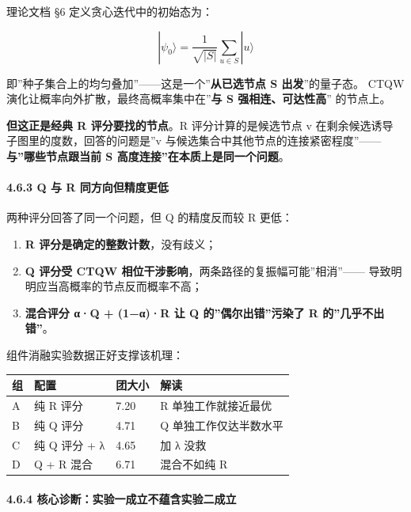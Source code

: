 \documentclass[
  11pt,
]{ctexart}
\newcounter{none} %
\providecommand{\tightlist}{%
  \setlength{\itemsep}{0pt}\setlength{\parskip}{0pt}}
\begin{document}
理论文档 §6 定义贪心迭代中的初始态为：

\[|\psi_0\rangle = \frac{1}{\sqrt{|S|}} \sum_{u \in S} |u\rangle\]

即''种子集合上的均匀叠加''------这是一个''\textbf{从已选节点 S
出发}''的量子态。 CTQW 演化让概率向外扩散，最终高概率集中在''\textbf{与
S 强相连、可达性高}'' 的节点上。

\textbf{但这正是经典 R 评分要找的节点}。R 评分计算的是候选节点 v
在剩余候选诱导 子图里的度数，回答的问题是''v
与候选集合中其他节点的连接紧密程度''------ \textbf{与''哪些节点跟当前 S
高度连接''在本质上是同一个问题}。

\paragraph{4.6.3 Q 与 R
同方向但精度更低}\label{q-ux4e0e-r-ux540cux65b9ux5411ux4f46ux7cbeux5ea6ux66f4ux4f4e}

两种评分回答了同一个问题，但 Q 的精度反而较 R 更低：

\begin{enumerate}
\def\labelenumi{\arabic{enumi}.}
\tightlist
\item
  \textbf{R 评分是确定的整数计数}，没有歧义；
\item
  \textbf{Q 评分受 CTQW
  相位干涉影响}，两条路径的复振幅可能''相消''------
  导致明明应当高概率的节点反而概率不高；
\item
  \textbf{混合评分 α·Q + (1−α)·R 让 Q 的''偶尔出错''污染了 R
  的''几乎不出错''}。
\end{enumerate}

组件消融实验数据正好支撑该机理：

{\def\LTcaptype{none} %
\begin{longtable}[]{@{}llll@{}}
\toprule\noalign{}
组 & 配置 & 团大小 & 解读 \\
\midrule\noalign{}
\endhead
\bottomrule\noalign{}
\endlastfoot
A & 纯 R 评分 & 7.20 & R 单独工作就接近最优 \\
B & 纯 Q 评分 & 4.71 & Q 单独工作仅达半数水平 \\
C & 纯 Q 评分 + λ & 4.65 & 加 λ 没救 \\
D & Q + R 混合 & 6.71 & 混合不如纯 R \\
\end{longtable}
}

\paragraph{4.6.4
核心诊断：实验一成立不蕴含实验二成立}\label{ux6838ux5fc3ux8bcaux65adux5b9eux9a8cux4e00ux6210ux7acbux4e0dux8574ux542bux5b9eux9a8cux4e8cux6210ux7acb}
\end{document}
